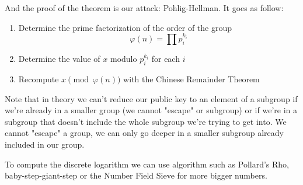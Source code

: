 \documentclass[a4paper,11pt,twocolumn]{article}
\begin{document}
And the proof of the theorem is our attack: Pohlig-Hellman. It goes as follow:

\begin{enumerate}
    \item Determine the prime factorization of the order of the group
        $$\varphi(n) = \prod p_i^{k_i} $$
    \item Determine the value of $x$ modulo $p_i^{k_i}$ for each $i$
    \item Recompute $x \pmod{\varphi(n)}$ with the Chinese Remainder Theorem
\end{enumerate}


Note that in theory we can't reduce our public key to an element of a subgroup if we're already in a smaller group (we cannot "escape" or subgroup) or if we're in a subgroup that doesn't include the whole subgroup we're trying to get into. We cannot "escape" a group, we can only go deeper in a smaller subgroup already included in our group.

To compute the discrete logarithm we can use algorithm such as Pollard's Rho, baby-step-giant-step or the Number Field Sieve for more bigger numbers.
\end{document}
